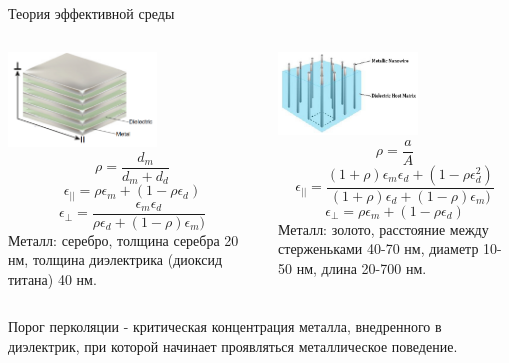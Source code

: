 \documentclass[9pt, compress, xcolor=table]{beamer}
\begin{document}
\begin{frame}{Теория эффективной среды}
\begin{columns}
\column{6.5cm}
\begin{center}
\includegraphics[width=0.6\textwidth]{neg_ref_n9}
\begin{equation*}
\rho=\frac{d_m}{d_m+d_d}
\end{equation*}
\begin{equation*}
\epsilon_{||}=\rho\epsilon_m+(1-\rho\epsilon_d)
\end{equation*}
\begin{equation*}
\epsilon_{\perp}=\frac{\epsilon_m \epsilon_d}{\rho\epsilon_d+(1-\rho)\epsilon_m)}
\end{equation*}
Металл: серебро, толщина серебра 20 нм, толщина диэлектрика (диоксид титана) 40 нм.
\end{center}
\column{6.5cm}
\begin{center}
\includegraphics[width=0.6\textwidth]{neg_ref_n10}
\begin{equation*}
\rho=\frac{a}{A}
\end{equation*}
\begin{equation*}
\epsilon_{||}=\frac{(1+\rho)\epsilon_m \epsilon_d+(1-\rho \epsilon_d^2)}{(1+\rho)\epsilon_d+(1-\rho)\epsilon_m)}
\end{equation*}
\begin{equation*}
\epsilon_{\perp}=\rho\epsilon_m+(1-\rho\epsilon_d)
\end{equation*}
Металл: золото, расстояние между стерженьками 40-70 нм, диаметр 10-50 нм, длина 20-700 нм.
\end{center}
\end{columns}
\textcolor{red!50!black}{Порог перколяции} - критическая концентрация металла, внедренного в диэлектрик, при которой начинает проявляться металлическое поведение.
\end{frame}
\end{document}
